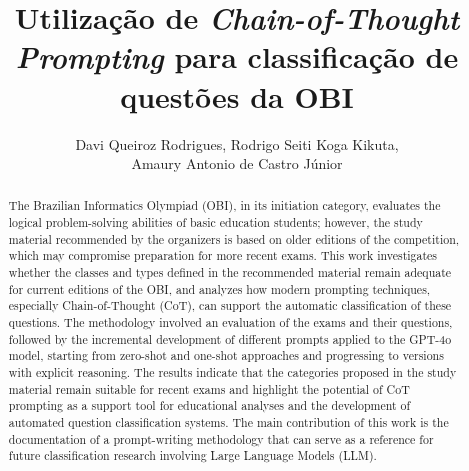 \documentclass[12pt]{article}
\title{Utilização de \textit{Chain-of-Thought Prompting} para classificação de questões da OBI}
\author{Davi Queiroz Rodrigues\inst{1}, Rodrigo Seiti Koga Kikuta\inst{1}, \\ Amaury Antonio de Castro Júnior\inst{1}}
\begin{document}
 

\maketitle

\vspace{-10pt}
\begin{abstract}
    The Brazilian Informatics Olympiad (OBI), in its initiation category, evaluates the logical problem-solving abilities of basic education students; however, the study material recommended by the organizers is based on older editions of the competition, which may compromise preparation for more recent exams. This work investigates whether the classes and types defined in the recommended material remain adequate for current editions of the OBI, and analyzes how modern prompting techniques, especially Chain-of-Thought (CoT), can support the automatic classification of these questions. The methodology involved an evaluation of the exams and their questions, followed by the incremental development of different prompts applied to the GPT-4o model, starting from zero-shot and one-shot approaches and progressing to versions with explicit reasoning. The results indicate that the categories proposed in the study material remain suitable for recent exams and highlight the potential of CoT prompting as a support tool for educational analyses and the development of automated question classification systems. The main contribution of this work is the documentation of a prompt-writing methodology that can serve as a reference for future classification research involving Large Language Models (LLM).
\end{abstract}
\end{document}
